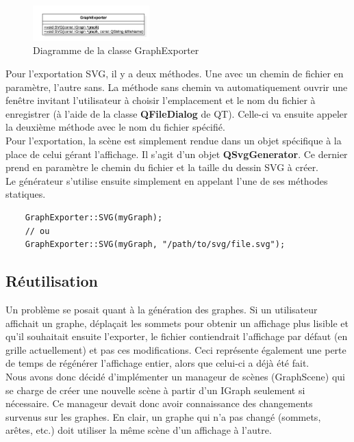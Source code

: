 \documentclass[french]{article}
\begin{document}
	\begin{figure}[H]
		\centering
		\includegraphics[width=0.4\textwidth]{Conception/visualization/graphexporter.png}
		\caption{Diagramme de la classe GraphExporter}
	\end{figure}
	
	Pour l'exportation SVG, il y a deux méthodes. Une avec un chemin de fichier en paramètre, l'autre sans. La méthode sans chemin va automatiquement ouvrir une fenêtre invitant l'utilisateur à choisir l'emplacement et le nom du fichier à enregistrer (à l'aide de la classe \textbf{QFileDialog} de QT). Celle-ci va ensuite appeler la deuxième méthode avec le nom du fichier spécifié. \\
	Pour l'exportation, la scène est simplement rendue dans un objet spécifique à la place de celui gérant l'affichage. Il s'agit d'un objet \textbf{QSvgGenerator}. Ce dernier prend en paramètre le chemin du fichier et la taille du dessin SVG à créer. \\
	
	Le générateur s'utilise ensuite simplement en appelant l'une de ses méthodes statiques.
	
	\begin{lstlisting}
	GraphExporter::SVG(myGraph);
	// ou
	GraphExporter::SVG(myGraph, "/path/to/svg/file.svg");
	\end{lstlisting}
	
	\subsection{Réutilisation}
	Un problème se posait quant à la génération des graphes. Si un utilisateur affichait un graphe, déplaçait les sommets pour obtenir un affichage plus lisible et qu'il souhaitait ensuite l'exporter, le fichier contiendrait l'affichage par défaut (en grille actuellement) et pas ces modifications. Ceci représente également une perte de temps de régénérer l'affichage entier, alors que celui-ci a déjà été fait. \\
	Nous avons donc décidé d'implémenter un manageur de scènes (GraphScene) qui se charge de créer une nouvelle scène à partir d'un IGraph seulement si nécessaire. Ce manageur devait donc avoir connaissance des changements survenus sur les graphes. En clair, un graphe qui n'a pas changé (sommets, arêtes, etc.) doit utiliser la même scène d'un affichage à l'autre. \\
	
\end{document}
